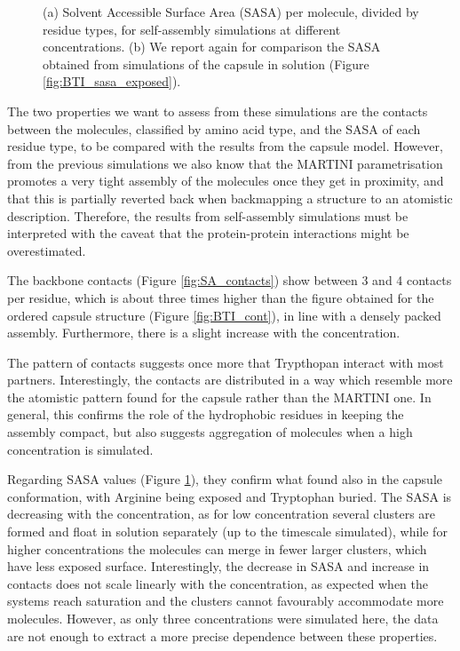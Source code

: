 \begin{figure}
\caption[(SI) Self-assembly simulations: SASA]{(a) Solvent Accessible Surface Area (SASA) per molecule, divided by residue types, for self-assembly simulations at different concentrations. (b) We report again for comparison the SASA obtained from simulations of the capsule in solution (Figure \ref{fig:BTI_sasa_exposed}).}
\label{fig:SA_sasa_all}
\end{figure}

The two properties we want to assess from these simulations are the contacts between the molecules, classified by amino acid type, and the SASA of each residue type, to be compared with the results from the capsule model. However, from the previous simulations we also know that the MARTINI parametrisation promotes a very tight assembly of the molecules once they get in proximity, and that this is partially reverted back when backmapping a structure to an atomistic description. Therefore, the results from self-assembly simulations must be interpreted with the caveat that the protein-protein interactions might be overestimated.

The backbone contacts (Figure \ref{fig:SA_contacts}) show between 3 and 4 contacts per residue, which is about three times higher than the figure obtained for the ordered capsule structure (Figure \ref{fig:BTI_cont}), in line with a densely packed assembly.
%
Furthermore, there is a slight increase with the concentration.

The pattern of contacts suggests once more that Trypthopan interact with most partners. Interestingly, the contacts are distributed in a way which resemble more the atomistic pattern found for the capsule rather than the MARTINI one. In general, this confirms the role of the hydrophobic residues in keeping the assembly compact, but also suggests aggregation of molecules when a high concentration is simulated.

Regarding SASA values (Figure \ref{fig:SA_sasa_all}), they confirm what found also in the capsule conformation, with Arginine being exposed and Tryptophan buried. The SASA is decreasing with the concentration, as for low concentration several clusters are formed and float in solution separately (up to the timescale simulated), while for higher concentrations the molecules can merge in fewer larger clusters, which have less exposed surface.
%
Interestingly, the decrease in SASA and increase in contacts does not scale linearly with the concentration, as expected when the systems reach saturation and the clusters cannot favourably accommodate more molecules. However, as only three concentrations were simulated here, the data are not enough to extract a more precise dependence between these properties.

